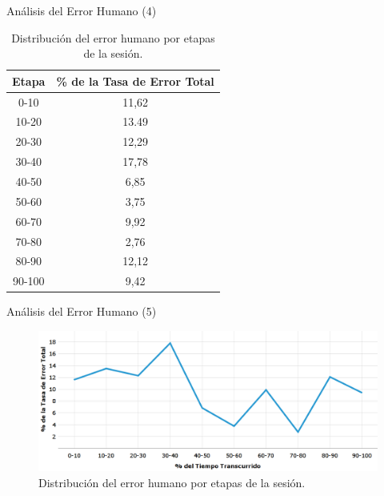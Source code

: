 \begin{frame}{An\'alisis del Error Humano (4)}
\begin{table}[H]
\centering
\footnotesize
\begin{tabular}{|c|c|}
\hline
    Etapa & \% de la Tasa de Error Total \\
    \hline
0-10  &  11,62 \\
10-20 &  13.49 \\
20-30 &  12,29 \\
30-40 &  17,78 \\
40-50 &  6,85 \\
50-60 &  3,75 \\
60-70 &  9,92 \\
70-80 &  2,76 \\
80-90 &  12,12 \\
90-100 & 9,42 \\
    \hline
\end{tabular}
\caption{Distribuci\'on del error humano por etapas de la sesi\'on.}
\label{sec:error-tiempo}
\end{table}

\end{frame}

\begin{frame}{An\'alisis del Error Humano (5)}
\begin{figure}[ht]
\centering
\includegraphics[width=0.8\linewidth]{./graphics/error_tiempo.png}
\caption{Distribuci\'on del error humano por etapas de la sesi\'on.}
\label{figure:gerror-tiempo}
\end{figure}
\end{frame}

